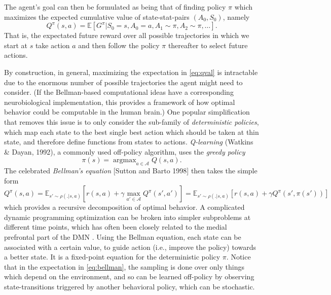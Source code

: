 \documentclass{article} %
\DeclareMathOperator{\argmax}{argmax}
\begin{document}
The agent's goal can then be formulated as being that of finding policy $\pi$ which maximizes the
expected cumulative value of state-stat-pairs $(A_0,S_0)$, namely
\begin{equation}
  \label{eq:qval}
  Q^{\pi}(s,a) = \mathbb E [G^\pi|S_0=s,A_0=a,A_1 \sim \pi,A_2 \sim \pi,\ldots].
\end{equation}
That is, the expectated future reward over all possible trajectories in which we start at $s$ take
action $a$ and then follow the policy $\pi$ thereafter to select future actions.

By construction, in general, maximizing the expectation in  \eqref{eq:qval} is intractable due to
the enormous number of possible trajectories the agent might need to
consider.
(If the Bellman-based computational ideas have a corresponding
neurobiological implementation, this provides a framework of how
optimal behavior could be computable in the human brain.)
One popular simplification that removes this issue is to only consider the sub-family of
\textit{deterministic policies}, which map each state to the best single best action which
should be taken at thin state, and therefore define functions from states to actions.
\textit{Q-learning} (Watkins \& Dayan, 1992), a commonly used off-policy algorithm, uses the
\textit{greedy policy}
\begin{equation}
  \pi(s) = \argmax_{a \in \mathcal A}{Q}(s, a).
  \label{eq:qlearning}
\end{equation}
The celebrated \textit{Bellman's equation} [Sutton and Barto 1998] then takes the simple form
\begin{equation}
  Q^\pi(s, a) = \mathbb E_{s' \sim \rho(.|s,a)} [r(s,a) + \gamma \max_{a' \in \mathcal A}Q^\pi(s', a')]
  = \mathbb E_{s' \sim \rho(.|s,a)} [r(s,a) + \gamma Q^\pi(s', \pi(s'))]
  \label{eq:bellman}
\end{equation}
which provides a recursive decomposition of optimal behavior.
A complicated dynamic programming optimization can be
broken into simpler subproblems at different time points,
which has often been closely related to the medial prefrontal part of the DMN
\cite{koechlin1999role, braver2002role}.
Using the Bellman equation, each state can be associated with a certain value,
to guide action (i.e., improve the policy) towards a better state.
It is a fixed-point equation for the deterministic policy $\pi$.
Notice that in the expectation in \eqref{eq:bellman}, the sampling is done over only things which
depend on the environment, and so can be learned off-policy by observing state-transitions
triggered by another behavioral policy, which can be stochastic.
\end{document}

